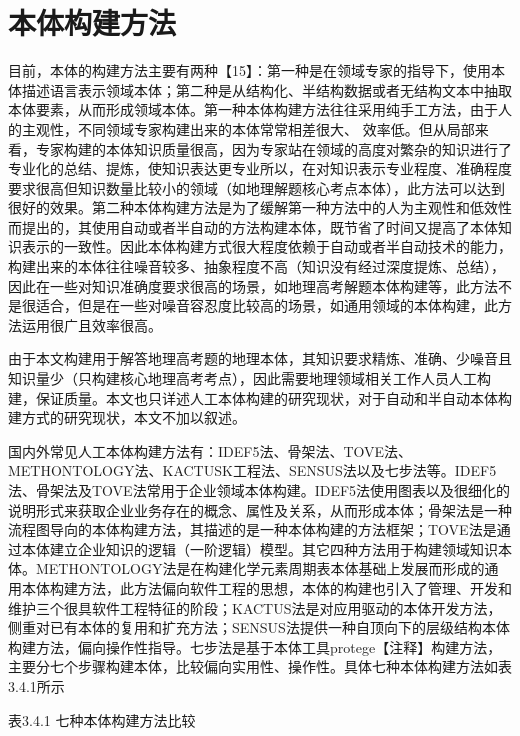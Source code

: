 \section{本体构建方法}
目前，本体的构建方法主要有两种【15】：第一种是在领域专家的指导下，使用本体描述语言表示领域本体；第二种是从结构化、半结构数据或者无结构文本中抽取本体要素，从而形成领域本体。第一种本体构建方法往往采用纯手工方法，由于人的主观性，不同领域专家构建出来的本体常常相差很大、
效率低。但从局部来看，专家构建的本体知识质量很高，因为专家站在领域的高度对繁杂的知识进行了专业化的总结、提炼，使知识表达更专业所以，在对知识表示专业程度、准确程度要求很高但知识数量比较小的领域（如地理解题核心考点本体），此方法可以达到很好的效果。第二种本体构建方法是为了缓解第一种方法中的人为主观性和低效性而提出的，其使用自动或者半自动的方法构建本体，既节省了时间又提高了本体知识表示的一致性。因此本体构建方式很大程度依赖于自动或者半自动技术的能力，构建出来的本体往往噪音较多、抽象程度不高（知识没有经过深度提炼、总结），因此在一些对知识准确度要求很高的场景，如地理高考解题本体构建等，此方法不是很适合，但是在一些对噪音容忍度比较高的场景，如通用领域的本体构建，此方法运用很广且效率很高。

由于本文构建用于解答地理高考题的地理本体，其知识要求精炼、准确、少噪音且知识量少（只构建核心地理高考考点），因此需要地理领域相关工作人员人工构建，保证质量。本文也只详述人工本体构建的研究现状，对于自动和半自动本体构建方式的研究现状，本文不加以叙述。

国内外常见人工本体构建方法有：IDEF5法、骨架法、TOVE法、METHONTOLOGY法、KACTUSK工程法、SENSUS法以及七步法等。IDEF5法、骨架法及TOVE法常用于企业领域本体构建。IDEF5法使用图表以及很细化的说明形式来获取企业业务存在的概念、属性及关系，从而形成本体；骨架法是一种流程图导向的本体构建方法，其描述的是一种本体构建的方法框架；TOVE法是通过本体建立企业知识的逻辑（一阶逻辑）模型。其它四种方法用于构建领域知识本体。METHONTOLOGY法是在构建化学元素周期表本体基础上发展而形成的通用本体构建方法，此方法偏向软件工程的思想，本体的构建也引入了管理、开发和维护三个很具软件工程特征的阶段；KACTUS法是对应用驱动的本体开发方法，侧重对已有本体的复用和扩充方法；SENSUS法提供一种自顶向下的层级结构本体构建方法，偏向操作性指导。七步法是基于本体工具protege【注释】构建方法，主要分七个步骤构建本体，比较偏向实用性、操作性。具体七种本体构建方法如表3.4.1所示

\begin{center}
	表3.4.1 七种本体构建方法比较
\end{center}

